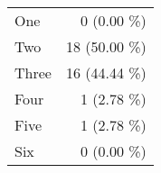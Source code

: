 \begin{tabular}{ l  r }
One & 0 (0.00 \%)\\
Two & 18 (50.00 \%)\\
Three & 16 (44.44 \%)\\
Four & 1 (2.78 \%)\\
Five & 1 (2.78 \%)\\
Six & 0 (0.00 \%)\\
\end{tabular}
